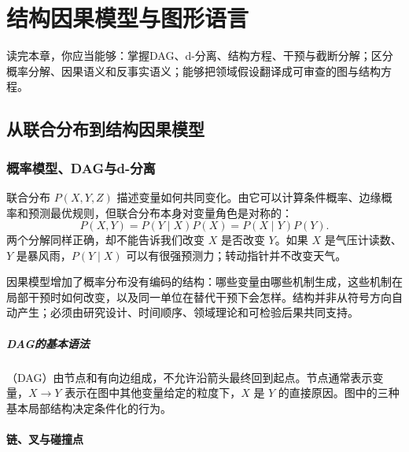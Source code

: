 \chapter{结构因果模型与图形语言}
\label{ch:scm-graphs}

\begin{learninggoals}
读完本章，你应当能够：掌握DAG、d-分离、结构方程、干预与截断分解；区分概率分解、因果语义和反事实语义；能够把领域假设翻译成可审查的图与结构方程。
\end{learninggoals}

\section{从联合分布到结构因果模型}

\subsection{概率模型、DAG与d-分离}

联合分布 $P(X,Y,Z)$ 描述变量如何共同变化。由它可以计算条件概率、边缘概率和预测最优规则，但联合分布本身对变量角色是对称的：
\[
P(X,Y)=P(Y\mid X)P(X)=P(X\mid Y)P(Y).
\]
两个分解同样正确，却不能告诉我们改变 $X$ 是否改变 $Y$。如果 $X$ 是气压计读数、$Y$ 是暴风雨，$P(Y\mid X)$ 可以有很强预测力；转动指针并不改变天气。

因果模型增加了概率分布没有编码的结构：哪些变量由哪些机制生成，这些机制在局部干预时如何改变，以及同一单位在替代干预下会怎样。结构并非从符号方向自动产生；必须由研究设计、时间顺序、领域理论和可检验后果共同支持。

\paragraph{DAG的基本语法}

（DAG）由节点和有向边组成，不允许沿箭头最终回到起点。节点通常表示变量，$X\rightarrow Y$ 表示在图中其他变量给定的粒度下，$X$ 是 $Y$ 的直接原因。图中的三种基本局部结构决定条件化的行为。

\subsubsection{链、叉与碰撞点}

\begin{center}
\end{center}

